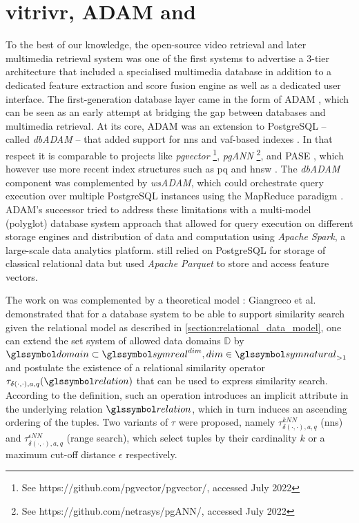 \section{vitrivr, ADAM and \texorpdfstring{\adampro{}}{ADAMpro}}
\label{section:vitrivr_adam_adampro}
To the best of our knowledge, the open-source \vitrivr{} video retrieval \cite{Rossetto:2016Vitrivr} and later multimedia retrieval \cite{Gasser:2019Multimodal} system was one of the first systems to advertise a 3-tier architecture that included a specialised multimedia database in addition to a dedicated feature extraction and score fusion engine as well as a dedicated user interface. The first-generation database layer came in the form of ADAM \cite{Giangreco:2014Adam}, which can be seen as an early attempt at bridging the gap between databases and multimedia retrieval. At its core, ADAM was an extension to PostgreSQL -- called \emph{dbADAM} -- that added support for \acrshort{nns} and \acrshort{vaf}-based indexes \cite{Weber:1998Va}. In that respect it is comparable to projects like \emph{pgvector} \footnote{See https://github.com/pgvector/pgvector/, accessed July 2022}, \emph{pgANN} \footnote{See https://github.com/netrasys/pgANN/, accessed July 2022}, and PASE \cite{Yang:2020Pase}, which however use more recent index structures such as \acrshort{pq} \cite{Jegou:2010Product} and \acrshort{hnsw} \cite{Malkov:2018Efficient}. The \emph{dbADAM} component was complemented by \emph{wsADAM}, which could orchestrate query execution over multiple PostgreSQL instances using the MapReduce paradigm \cite{Dean:2008Mapreduce}. ADAM's successor \adampro{} \cite{Giangreco:2016Adam} tried to address these limitations with a multi-model (polyglot) database system approach that allowed for query execution on different storage engines and distribution of data and computation using \emph{Apache Spark}, a large-scale data analytics platform. \adampro{} still relied on PostgreSQL for storage of classical relational data but used \emph{Apache Parquet} to store and access feature vectors. 

The work on \adampro{} was complemented by a theoretical model \cite{Giangreco:2018Database}: Giangreco et al. demonstrated that for a database system to be able to support similarity search given the relational model as described in \cref{section:relational_data_model}, one can extend the set system of allowed data domains $\mathbb{D}$ by $\domain \subset \symreal^{dim}, dim \in \symnatural_{>1}$ and postulate the existence of a relational similarity operator $\tau_{\delta(\cdot,\cdot),a,q}(\relation)$ that can be used to express similarity search. According to the definition, such an operation introduces an implicit attribute in the underlying relation $\relation$, which in turn induces an ascending ordering of the tuples. Two variants of $\tau$ were proposed, namely $\tau^{kNN}_{\delta(\cdot,\cdot),a,q}$ (\acrshort{nns}) and $\tau^{\epsilon NN}_{\delta(\cdot,\cdot),a,q}$ (range search), which select tuples by their cardinality $k$ or a maximum cut-off distance $\epsilon$ respectively.

